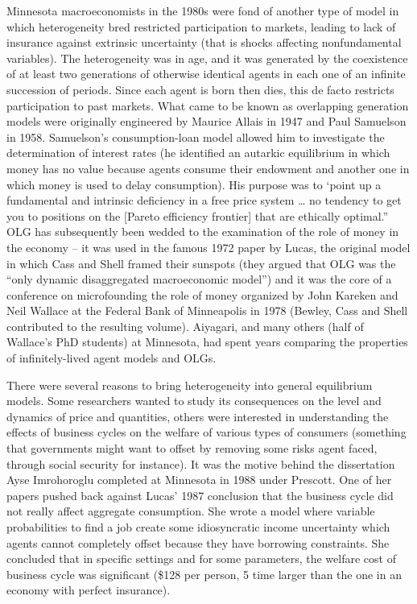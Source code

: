 \documentclass[10pt,math=newtx,citestyle=gb7714-2015,bibstyle=gb7714-2015]{elegantbook}
\begin{document}
{	Minnesota macroeconomists in the 1980s were fond of another type of model in which heterogeneity bred restricted participation to markets, leading to lack of insurance against extrinsic uncertainty (that is shocks affecting nonfundamental variables). The heterogeneity was in age, and it was generated by the coexistence of at least two generations of otherwise identical agents in each one of an infinite succession of periods. Since each agent is born then dies, this  de facto restricts participation to past markets. What came to be known as overlapping generation models were originally engineered by Maurice Allais in 1947 and Paul Samuelson in 1958. Samuelson’s consumption-loan model allowed him to investigate the determination of interest rates (he identified an autarkic equilibrium in which money has no value because agents consume their endowment and another one in which money is used to delay consumption). His purpose was to ‘point up a fundamental and intrinsic deficiency in a free price system … no tendency to get you to positions on the [Pareto efficiency frontier] that are ethically optimal.” OLG has subsequently been wedded to the examination of the role of money in the economy – it was used in the famous 1972 paper by Lucas, the original model in which Cass and Shell framed their sunspots (they argued that OLG was the “only dynamic disaggregated macroeconomic model”) and it was the core of a conference on microfounding the role of money organized by John Kareken and Neil Wallace at the Federal Bank of Minneapolis in 1978 (Bewley, Cass and Shell contributed to the resulting volume). Aiyagari, and many others (half of Wallace’s PhD students) at Minnesota, had spent years comparing the properties of infinitely-lived agent models and OLGs.
	
	There were several reasons to bring heterogeneity into general equilibrium models. Some researchers wanted to study its consequences on the level and dynamics of price and quantities, others were interested in understanding the effects of business cycles on the welfare of various types of consumers (something that governments might want to offset by removing some risks agent faced, through social security for instance). It was the motive behind the dissertation Ayse Imrohoroglu completed at Minnesota in 1988 under Prescott. One of her papers pushed back against Lucas’ 1987 conclusion that the business cycle did not really affect aggregate consumption. She wrote a model where variable probabilities to find a job create some idiosyncratic income uncertainty which agents cannot completely offset because they have borrowing constraints. She concluded that in specific settings and for some parameters, the welfare cost of business cycle was significant (\$128 per person, 5 time larger than the one in an economy with perfect insurance).
	
}
\end{document}
